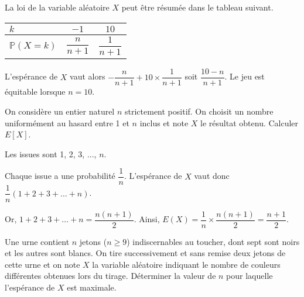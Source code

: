 \documentclass[11pt,fleqn, openany]{book} %
\begin{document}
\begin{solution}La loi de la variable aléatoire $X$ peut être résumée dans le tableau suivant.
\begin{center}
\begin{tabular}{|l|c|c|}
\hline
$k$ & $-1$ & $10$ \\
\hline
$\mathbb{P}(X=k)$ & $\dfrac{n}{n+1}$  & $\dfrac{1}{n+1}$ \\
\hline \end{tabular}
\end{center}

L'espérance de $X$ vaut alors $-\dfrac{n}{n+1}+10 \times \dfrac{1}{n+1}$ soit $\dfrac{10-n}{n+1}$. Le jeu est équitable lorsque $n=10$.\end{solution}



\begin{exercise}[topic=prob02]On considère un entier naturel $n$ strictement positif. On choisit un nombre uniformément au hasard entre 1 et $n$ inclus et note $X$ le résultat obtenu. Calculer $E[X]$.\end{exercise}


\begin{solution}Les issues sont 1, 2, 3, ..., $n$. 

Chaque issue a une probabilité $\dfrac{1}{n}$. L'espérance de $X$ vaut donc $\dfrac{1}{n}(1+2+3+\dots + n)$.

Or, $1+2+3+\dots + n=\dfrac{n(n+1)}{2}$. Ainsi, $E(X)=\dfrac{1}{n} \times \dfrac{n(n+1)}{2}=\dfrac{n+1}{2}$.\end{solution}



\begin{exercise}[topic=prob02]Une urne contient $n$ jetons ($n \geqslant 9$) indiscernables au toucher, dont sept sont noirs et les autres sont blancs. On tire successivement et sans remise deux jetons de cette urne et on note $X$ la variable aléatoire indiquant le nombre de couleurs différentes obtenues lors du tirage. Déterminer la valeur de $n$ pour laquelle l'espérance de $X$ est maximale.\end{exercise}
\end{document}
